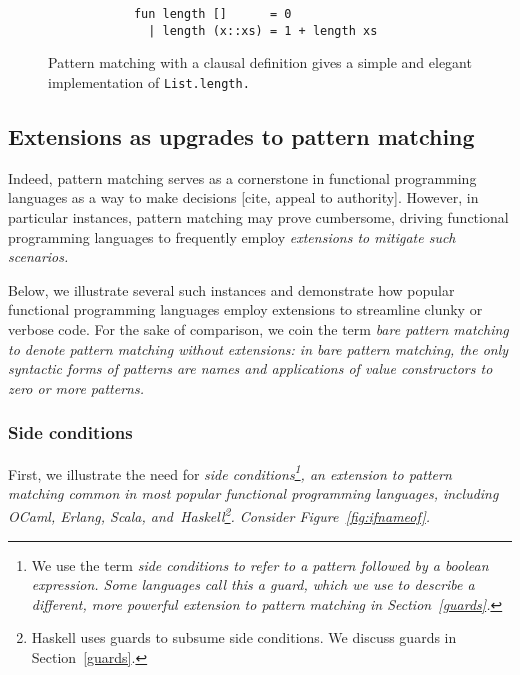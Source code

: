 \documentclass[manuscript,screen,review, 12pt]{acmart}
\begin{document}
    \begin{figure}[ht]
    \smllst
    \begin{verbatim}
            fun length []      = 0
              | length (x::xs) = 1 + length xs
        \end{verbatim}
    \caption{Pattern matching with a clausal definition gives a simple and 
             elegant implementation of \tt{List.length}.}
    \label{fig:pmclausallen}
    \end{figure}
        

    
\subsection{Extensions as upgrades to pattern matching}

    Indeed, pattern matching serves as a cornerstone in functional programming
    languages as a way to make decisions [cite, appeal to authority]. However,
    in particular instances, pattern matching may prove cumbersome, driving
    functional programming languages to frequently employ \it{extensions} to mitigate such
    scenarios. 
    
    Below, we illustrate several such instances and demonstrate how popular
    functional programming languages employ extensions to streamline clunky or verbose code.
    For the sake of comparison, we coin the term \it{bare pattern matching} to
    denote pattern matching \it{without} extensions: in bare pattern matching,
    the only syntactic forms of patterns are names and applications of value
    constructors to zero or more patterns. 
    

    

\subsubsection{Side conditions}

    First, we illustrate the need for \it{side conditions}\footnote{We use the
    term \it{side conditions} to refer to a pattern followed by a boolean
    expression. Some languages call this a \it{guard}, which we use to describe
    a different, more powerful extension to pattern matching in
    Section~\ref{guards}.}, an extension to pattern matching common in most
    popular functional programming languages, including OCaml, Erlang, Scala,
    and~Haskell\footnote{Haskell uses guards to subsume side conditions. We
    discuss guards in Section~\ref{guards}.}. Consider
    Figure~\ref{fig:ifnameof}. 
    
\end{document}

